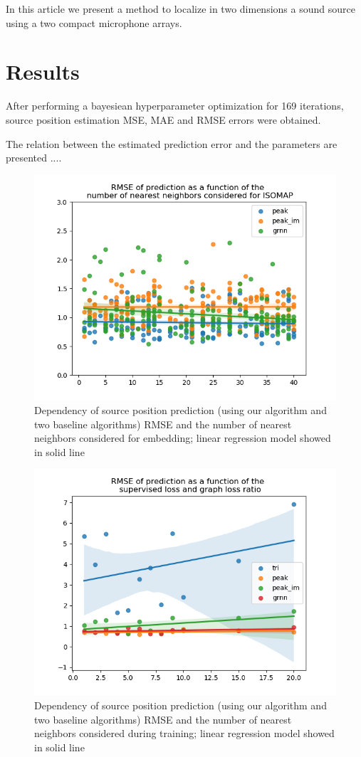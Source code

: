 \documentclass[applsci,article,submit,moreauthors,pdftex]{Definitions/mdpi}
\begin{document}
In this article we present a method to localize in two dimensions a sound source using a two compact microphone arrays. 

 
\section{Results}

After performing a bayesiean hyperparameter optimization for 169 iterations, source position estimation MSE, MAE and RMSE errors were obtained. 

The relation between the estimated prediction error and the parameters are presented ....

\begin{figure}[h!]
	\centering
	\includegraphics[width=0.4\linewidth]{img/rmse_n_neighbors}
	\caption{Dependency of source position prediction (using our algorithm and two baseline algorithms) RMSE and the number of nearest neighbors considered for \isomap{} embedding; linear regression model showed in solid line}
	\label{fig:rmsenneighbors}
\end{figure}

\begin{figure}[h!]
	\centering
	\includegraphics[width=0.4\linewidth]{img/rmse_gnbrs}
	\caption{Dependency of source position prediction (using our algorithm and two baseline algorithms) RMSE and the number of nearest neighbors considered during \grnn{} training; linear regression model showed in solid line}
	\label{fig:rmsegnbrs}
\end{figure}
\end{document}
